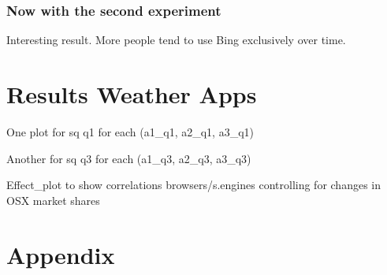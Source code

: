 \documentclass[
  11pt,
]{article}
\begin{document}
\hypertarget{now-with-the-second-experiment}{%
\subsubsection{Now with the second experiment}\label{now-with-the-second-experiment}}

Interesting result. More people tend to use Bing exclusively over time.

\hypertarget{results-weather-apps}{%
\section{Results Weather Apps}\label{results-weather-apps}}

One plot for sq q1 for each (a1\_q1, a2\_q1, a3\_q1)

Another for sq q3 for each (a1\_q3, a2\_q3, a3\_q3)

Effect\_plot to show correlations browsers/s.engines controlling for changes in OSX market shares

\hypertarget{appendix}{%
\section{Appendix}\label{appendix}}
\end{document}
